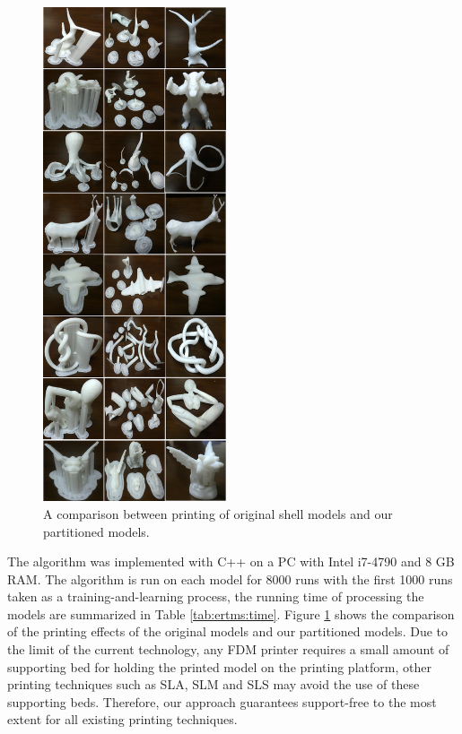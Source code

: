 \begin{figure}[tbp]
  \centering
  \includegraphics[width=0.48\textwidth]{figs/experiment.png}
  \caption{\label{fig:experiment}%
           A comparison between printing of original shell models and our partitioned models.}
\end{figure}

The algorithm was implemented with C++ on a PC with Intel i7-4790 and 8 GB RAM. The algorithm is run on each model for 8000 runs with the first 1000 runs taken as a training-and-learning process, the running time of processing the models are summarized in Table \ref{tab:ertms:time}. Figure \ref{fig:experiment} shows the comparison of the printing effects of the original models and our partitioned models. Due to the limit of the current technology, any FDM printer requires a small amount of supporting bed for holding the printed model on the printing platform, other printing techniques such as SLA, SLM and SLS may avoid the use of these supporting beds. Therefore, our approach guarantees support-free to the most extent for all existing printing techniques.

